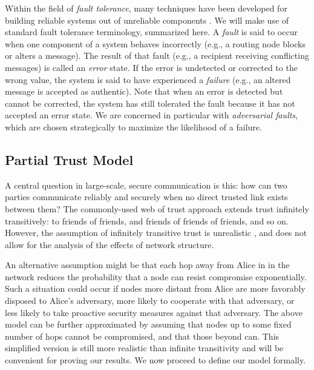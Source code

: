 \documentclass{sig-alternate-05-2015}
\begin{document}
Within the field of {\em fault tolerance},
many techniques have been developed for building reliable systems
out of unreliable components
\cite{avizienis_basic_2004, von_neumann_probabilistic_1956}.
We will make use of standard fault tolerance terminology, summarized here.
A {\em fault} is said to occur when one component
of a system behaves incorrectly (e.g., a routing node blocks or
alters a message).
The result of that fault (e.g., a recipient receiving conflicting messages)
is called an {\em error} state.
If the error is undetected or corrected to the wrong value, the system is
said to have experienced a {\em failure} (e.g., an altered message is
accepted as authentic).
Note that when an error is detected but cannot be corrected,
the system has still tolerated the fault because it has not accepted an error
state.
We are concerned in particular with {\em adversarial faults},
which are chosen strategically to maximize the likelihood of a failure.

\subsection{Partial Trust Model}

A central question in large-scale, secure communication is this:
how can two parties communicate reliably and securely
when no direct trusted link exists between them?
The commonly-used web of trust approach
\cite{zimmermann_official_1995,ferguson_practical_2003}
extends trust infinitely transitively:
to friends of friends, and friends of friends of friends, and so on.
However, the assumption of infinitely transitive trust is unrealistic
\cite{christianson_why_1997},
and does not allow for the analysis of the effects of network structure.

An alternative assumption might be that each hop away from Alice in
in the network
reduces the probability that a node can resist compromise exponentially.
Such a situation could occur if nodes more distant from Alice are
more favorably disposed to Alice's adversary, more likely to cooperate with that
adversary, or less likely to take proactive security measures against that
adversary.
The above model can be further
approximated by assuming that nodes up to some fixed number
of hops cannot be compromised, and that those beyond can.
This simplified version is still more realistic than infinite transitivity
and will be convenient for proving our results.
We now proceed to define our model formally.
\end{document}
